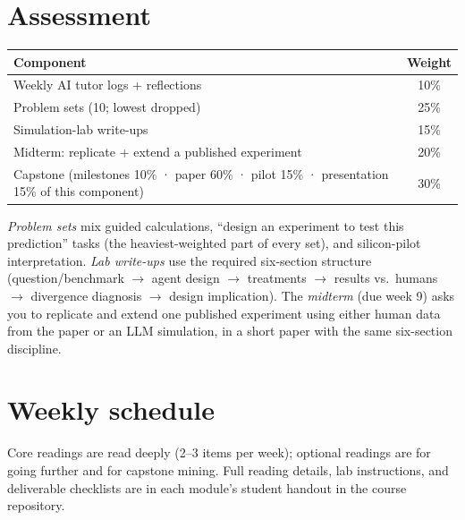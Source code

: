 \documentclass[11pt]{article}
\begin{document}
\section*{Assessment}
\begin{center}
\begin{tabular}{@{}lc@{}}
\toprule
Component & Weight \\
\midrule
Weekly AI tutor logs + reflections & 10\% \\
Problem sets (10; lowest dropped) & 25\% \\
Simulation-lab write-ups & 15\% \\
Midterm: replicate + extend a published experiment & 20\% \\
Capstone (milestones 10\% · paper 60\% · pilot 15\% ·
presentation 15\% of this component) & 30\% \\
\bottomrule
\end{tabular}
\end{center}

\noindent\emph{Problem sets} mix guided calculations, ``design an
experiment to test this prediction'' tasks (the heaviest-weighted
part of every set), and silicon-pilot interpretation. \emph{Lab
write-ups} use the required six-section structure (question/benchmark
$\to$ agent design $\to$ treatments $\to$ results vs.\ humans $\to$
divergence diagnosis $\to$ design implication). The \emph{midterm}
(due week 9) asks you to replicate and extend one published experiment
using either human data from the paper or an LLM simulation, in a
short paper with the same six-section discipline.

\section*{Weekly schedule}
Core readings are read deeply (2--3 items per week); optional readings
are for going further and for capstone mining. Full reading details,
lab instructions, and deliverable checklists are in each module's
student handout in the course repository.
\end{document}

